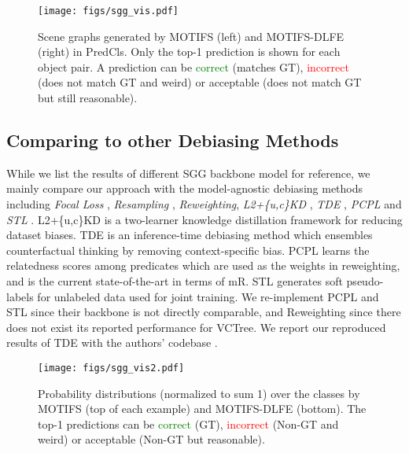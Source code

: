 \documentclass[sigconf]{acmart}
\begin{document}
\begin{figure}[t!]
\begin{center}
\texttt{[image: figs/sgg\_vis.pdf]}
\end{center}
\vspace{-1.2em}
  \caption{Scene graphs generated by MOTIFS (left) and MOTIFS-DLFE (right) in PredCls. 
  Only the top-1 prediction is shown for each object pair.
  A prediction can be \textcolor{Green}{correct} (matches GT), \textcolor{Red}{incorrect} (does not match GT and weird) or \textcolor{Dandelion}{acceptable} (does not match GT but still reasonable).
  }
\label{fig:sgg_vis}
\vspace{-1.5em}
\end{figure}

\subsection{Comparing to other Debiasing Methods}
\label{sec:compare_dlfe_to_sota}

While we list the results of different SGG backbone model for reference, we mainly compare our approach with the model-agnostic debiasing methods including \textit{Focal Loss} \cite{lin2017focal}, \textit{Resampling} \cite{burnaev2015influence}, \textit{Reweighting}, \textit{L2+\{u,c\}KD} \cite{DBLP:conf/bmvc/WangPL20}, \textit{TDE} \cite{tang2020unbiased}, \textit{PCPL} \cite{yan2020pcpl} and \textit{STL} \cite{chen2019soft}. 
L2+\{u,c\}KD is a two-learner knowledge distillation framework for reducing dataset biases.
TDE is an inference-time debiasing method which ensembles counterfactual thinking by removing context-specific bias.
PCPL learns the relatedness scores among predicates which are used as the weights in reweighting, and is the current state-of-the-art in terms of mR.
STL generates soft pseudo-labels for unlabeled data used for joint training.
We re-implement PCPL and STL since their backbone is not directly comparable, and Reweighting since there does not exist its reported performance for VCTree.
We report our reproduced results of TDE with the authors' codebase \cite{tang2020sggcode}.

\begin{figure*}[t!]
\begin{center}
\texttt{[image: figs/sgg\_vis2.pdf]}
\end{center}
\vspace{-1.8em}
  \caption{
  Probability distributions (normalized to sum 1) over the classes by MOTIFS (top of each example) and MOTIFS-DLFE (bottom). 
  The top-1 predictions can be \textcolor{Green}{correct} (GT), \textcolor{Red}{incorrect} (Non-GT and weird) or \textcolor{Dandelion}{acceptable} (Non-GT but reasonable).
  }
\label{fig:sgg_vis_dist}
\vspace{-1em}
\end{figure*}
\end{document}
